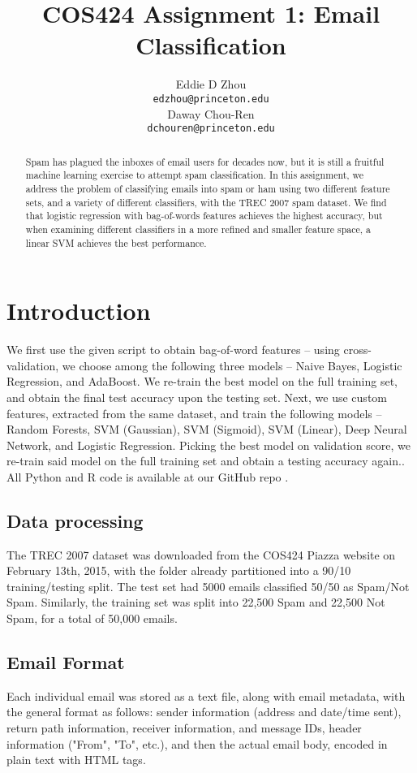 \documentclass{article} %
\title{COS424 Assignment 1: Email Classification}
\author{
Eddie D Zhou\\
\texttt{edzhou@princeton.edu} \\
\And
Daway Chou-Ren\\
\texttt{dchouren@princeton.edu} \\
}
\begin{document}
\maketitle

\begin{abstract}
Spam has plagued the inboxes of email users for decades now, but it is still a fruitful machine learning exercise to attempt spam classification.  In this assignment, we address the problem of classifying emails into spam or ham using two different feature sets, and a variety of different classifiers, with the TREC 2007 spam dataset.  We find that logistic regression with bag-of-words features achieves the highest accuracy, but when examining different classifiers in a more refined and smaller feature space, a linear SVM achieves the best performance.
\end{abstract}
\section{Introduction}
We first use the given script to obtain bag-of-word features -- using cross-validation, we choose among the following three models -- Naive Bayes, Logistic Regression, and AdaBoost.  We re-train the best model on the full training set, and obtain the final test accuracy upon the testing set.  Next, we use custom features, extracted from the same dataset, and train the following models -- Random Forests, SVM (Gaussian), SVM (Sigmoid), SVM (Linear), Deep Neural Network, and Logistic Regression.  Picking the best model on validation score, we re-train said model on the full training set and obtain a testing accuracy again.\cite{guzella2009review, hastie2009elements}.  All Python and R code is available at our GitHub repo \cite{gh}.
\subsection{Data processing}
The TREC 2007 dataset was downloaded from the COS424 Piazza website on February 13th, 2015, with the folder already partitioned into a 90/10 training/testing split.\cite{dataset} The test set had 5000 emails classified 50/50 as Spam/Not Spam. Similarly, the training set was split into 22,500 Spam and 22,500 Not Spam, for a total of 50,000 emails. 
\subsection*{Email Format}
Each individual email was stored as a text file, along with email metadata, with the general format as follows: sender information (address and date/time sent), return path information, receiver information, and message IDs, header information ("From", "To", etc.), and then the actual email body, encoded in plain text with HTML tags.
\end{document}
